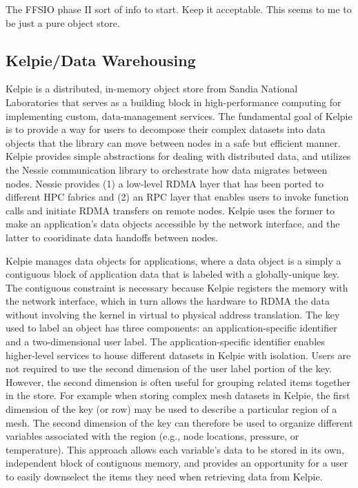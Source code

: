 The FFSIO phase II sort of info to start. Keep it acceptable. This seems to me
to be just a pure object store.

\subsection{Kelpie/Data Warehousing}

Kelpie is a distributed, in-memory object store from Sandia National Laboratories that serves as a building block in high-performance computing for implementing custom, data-management services. The fundamental goal of Kelpie is to provide a way for users to decompose their complex datasets into data objects that the library can move between nodes in a safe but efficient manner. Kelpie provides simple abstractions for dealing with distributed data, and utilizes the Nessie communication library to orchestrate how data migrates between nodes. Nessie provides (1) a low-level RDMA layer that has been ported to different HPC fabrics and (2) an RPC layer that enables users to invoke function calls and initiate RDMA transfers on remote nodes. Kelpie uses the former to make an application's data objects accessible by the network interface, and the latter to cooridinate data handoffs between nodes.

Kelpie manages data objects for applications, where a data object is a simply a contiguous block of application data that is labeled with a globally-unique key. The contiguous constraint is necessary because Kelpie registers the memory with the network interface, which in turn allows the hardware to RDMA the data without involving the kernel in virtual to physical address translation. The key used to label an object has three components: an application-specific identifier and a two-dimensional user label. The application-specific identifier enables higher-level services to house different datasets in Kelpie with isolation. Users are not required to use the second dimension of the user label portion of the key. However, the second dimension is often useful for grouping related items together in the store. For example when storing complex mesh datasets in Kelpie, the first dimension of the key (or row) may be used to describe a particular region of a mesh. The second dimension of the key can therefore be used to organize different variables associated with the region (e.g., node locations, pressure, or temperature). This approach allows each variable's data to be stored in its own, independent block of contiguous memory, and provides an opportunity for a user to easily downselect the items they need when retrieving data from Kelpie.

